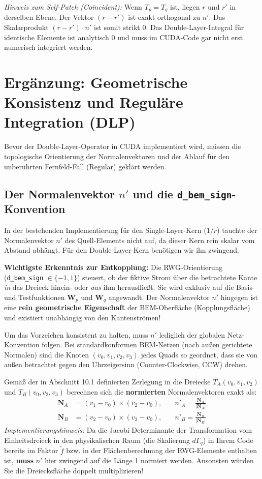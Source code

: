 \documentclass[11pt,a4paper]{article}
\begin{document}
\textit{Hinweis zum Self-Patch (Coincident):} Wenn $T_p = T_q$ ist, liegen $r$ und $r'$ in derselben Ebene. Der Vektor $(r - r')$ ist exakt orthogonal zu $n'$. Das Skalarprodukt $(r - r') \cdot n'$ ist somit strikt $0$. Das Double-Layer-Integral für identische Elemente ist analytisch $0$ und muss im CUDA-Code gar nicht erst numerisch integriert werden.

\clearpage
\section{Ergänzung: Geometrische Konsistenz und Reguläre Integration (DLP)}

Bevor der Double-Layer-Operator in CUDA implementiert wird, müssen die topologische Orientierung der Normalenvektoren und der Ablauf für den unberührten Fernfeld-Fall (Regular) geklärt werden.

\subsection{Der Normalenvektor $n'$ und die \texttt{d\_bem\_sign}-Konvention}

In der bestehenden Implementierung für den Single-Layer-Kern ($1/r$) tauchte der Normalenvektor $n'$ des Quell-Elements nicht auf, da dieser Kern rein skalar vom Abstand abhängt. Für den Double-Layer-Kern benötigen wir ihn zwingend.

\textbf{Wichtigste Erkenntnis zur Entkopplung:} 
Die RWG-Orientierung (\texttt{d\_bem\_sign} $\in \{-1, 1\}$) steuert, ob der fiktive Strom über die betrachtete Kante \textit{in} das Dreieck hinein- oder \textit{aus} ihm herausfließt. Sie wird exklusiv auf die Basis- und Testfunktionen $\mathbf{W}_p$ und $\mathbf{W}_q$ angewandt. 
Der Normalenvektor $n'$ hingegen ist eine \textbf{rein geometrische Eigenschaft} der BEM-Oberfläche (Kopplungsfläche) und existiert unabhängig von den Kantenströmen!

Um das Vorzeichen konsistent zu halten, muss $n'$ lediglich der globalen Netz-Konvention folgen. Bei standardkonformen BEM-Netzen (nach außen gerichtete Normalen) sind die Knoten $(v_0, v_1, v_2, v_3)$ jedes Quads so geordnet, dass sie von außen betrachtet gegen den Uhrzeigersinn (Counter-Clockwise, CCW) drehen. 

Gemäß der in Abschnitt 10.1 definierten Zerlegung in die Dreiecke $T_A(v_0, v_1, v_2)$ und $T_B(v_0, v_2, v_3)$ berechnen sich die \textbf{normierten} Normalenvektoren exakt als:
\begin{align}
    \mathbf{N}_A &= (v_1 - v_0) \times (v_2 - v_0), \quad &n'_A = \frac{\mathbf{N}_A}{|\mathbf{N}_A|} \\
    \mathbf{N}_B &= (v_2 - v_0) \times (v_3 - v_0), \quad &n'_B = \frac{\mathbf{N}_B}{|\mathbf{N}_B|}
\end{align}
\textit{Implementierungshinweis:} Da die Jacobi-Determinante der Transformation vom Einheitsdreieck in den physikalischen Raum (die Skalierung $d\Gamma_q$) in Ihrem Code bereits im Faktor $\tilde{f}$ bzw. in der Flächenberechnung der RWG-Elemente enthalten ist, \textbf{muss} $n'$ hier zwingend auf die Länge 1 normiert werden. Ansonsten würden Sie die Dreiecksfläche doppelt multiplizieren!
\end{document}
